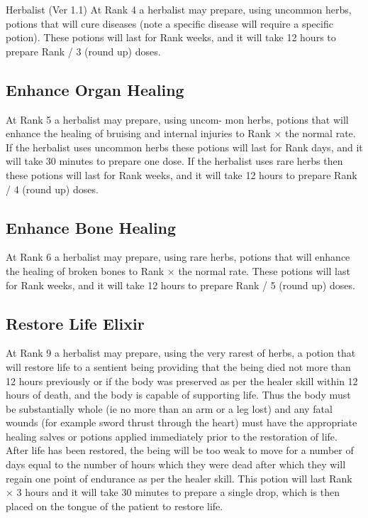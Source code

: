 \begin{Chapter}{Herbalist (Ver 1.1)}
At Rank 4 a herbalist may prepare, using uncommon herbs, potions that
will cure diseases (note a specific disease will require a specific
potion).  These potions will last for Rank weeks, and it will take 12
hours to prepare Rank / 3 (round up) doses.

\subsection{Enhance Organ Healing}

At Rank 5 a herbalist may prepare, using uncom- mon herbs, potions
that will enhance the healing of bruising and internal injuries to
Rank × the normal rate.  If the herbalist uses uncommon herbs these
potions will last for Rank days, and it will take 30 minutes to
prepare one dose.  If the herbalist uses rare herbs then these potions
will last for Rank weeks, and it will take 12 hours to prepare Rank /
4 (round up) doses.

\subsection{Enhance Bone Healing}

At Rank 6 a herbalist may prepare, using rare herbs, potions that will
enhance the healing of broken bones to Rank × the normal rate.  These
potions will last for Rank weeks, and it will take 12 hours to prepare
Rank / 5 (round up) doses.

\subsection{Restore Life Elixir}

At Rank 9 a herbalist may prepare, using the very rarest of herbs, a
potion that will restore life to a sentient being providing that the
being died not more than 12 hours previously or if the body was
preserved as per the healer skill within 12 hours of death, and the
body is capable of supporting life.  Thus the body must be
substantially whole (ie no more than an arm or a leg lost) and any
fatal wounds (for example sword thrust through the heart) must have
the appropriate healing salves or potions applied immediately prior to
the restoration of life.  After life has been restored, the being will
be too weak to move for a number of days equal to the number of hours
which they were dead after which they will regain one point of
endurance as per the healer skill. This potion will last Rank × 3
hours and it will take 30 minutes to prepare a single drop, which is
then placed on the tongue of the patient to restore life.


\end{Chapter}
